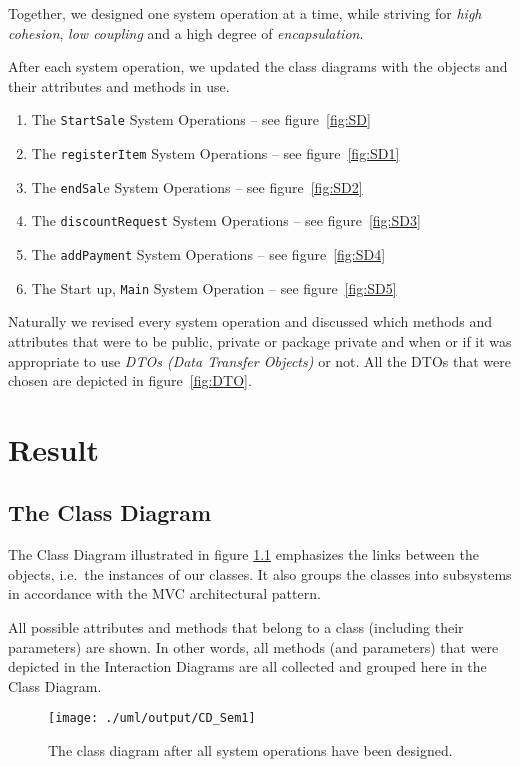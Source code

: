 \documentclass[a4paper]{scrreprt}
\begin{document}
Together, we designed one system operation at a time, while striving for \emph{high cohesion},
\emph{low coupling} and a high degree of \emph{encapsulation}.

After each system operation, we updated the class diagrams with the objects and their attributes and methods in use.
\begin{enumerate}
    \item The \verb|StartSale| System Operations -- see figure~\ref{fig:SD}
    \item The \verb|registerItem| System Operations -- see figure~\ref{fig:SD1}
    \item The \verb|endSal|e System Operations -- see figure~\ref{fig:SD2}
    \item The \verb|discountRequest| System Operations -- see figure~\ref{fig:SD3}
    \item The \verb|addPayment| System Operations -- see figure~\ref{fig:SD4}
    \item The Start up, \verb|Main| System Operation -- see figure~\ref{fig:SD5}
\end{enumerate}
Naturally we revised every system operation and discussed which methods and attributes that were to be
public, private or package private and when or if it was appropriate to use \emph{DTOs (Data Transfer Objects)} or not.
All the DTOs that were chosen are depicted in figure~\ref{fig:DTO}.

\newpage
\chapter{Result}
\label{sec:result}
\section{The Class Diagram}
The Class Diagram illustrated in figure \ref{fig:CD} emphasizes the links between the objects, i.e.\ the instances of
our classes.
It also groups the classes into subsystems in accordance with the MVC architectural pattern.

All possible attributes and methods that belong to a class (including their parameters) are shown.
In other words, all methods (and parameters) that were depicted in the Interaction Diagrams are all
collected and grouped here in the Class Diagram.
\begin{figure}[h!]
    \begin{center}
        \texttt{[image: ./uml/output/CD\_Sem1]}
        \caption{The class diagram after all system operations have been designed.}
        \label{fig:CD}
    \end{center}
\end{figure}
\end{document}
